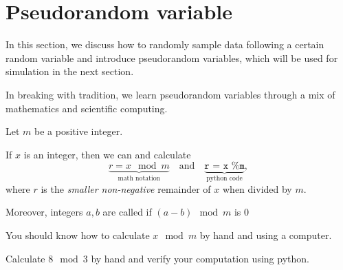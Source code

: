 \documentclass[../main.tex]{subfiles}
\begin{document}
 \section{Pseudorandom variable}

In this section, we discuss how to randomly sample data following a certain random variable and introduce pseudorandom variables, which will be used for simulation in the next section.

In breaking with tradition, we learn pseudorandom variables through a mix of mathematics and scientific computing. 

\begin{definition}
  Let \(m\) be a positive integer. 

  If \(x\) is an integer, then we can  and calculate
  \[
    \underbrace{r = x \mod{m}}_{\text{math notation}} 
    \quad\text{and}\quad
    \underbrace{\texttt{r = x \% m}}_{\text{python code}},
  \] where \(r\) is the \emph{smaller non-negative} remainder of \(x\) when divided by \(m\).  

  Moreover, integers \(a,b\) are called  if \((a - b) \mod{m}\) is \(0\)
\end{definition}
\faStar{} You should know how to calculate \(x \mod{m}\) by hand and using a computer.

\begin{example}
  Calculate \(8 \mod 3\) by hand and verify your computation using python.
\end{example}

%
%
\end{document}
